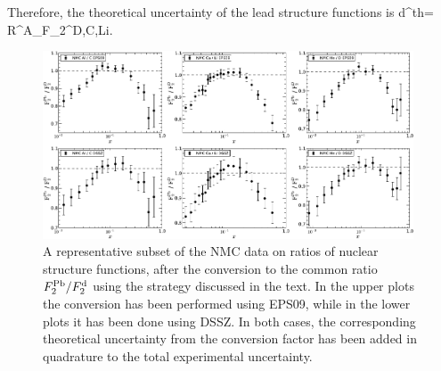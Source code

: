 Therefore, the theoretical uncertainty of the lead structure functions is
\be
d\sigma^{th}= \Delta {}R^A_{F_2^{D,C,Li}}.
\label{compression7}
\ee



\begin{figure}[t]
\begin{center}
\includegraphics[width=0.98\textwidth]{plots/fig1nmc.pdf}
\end{center}
\vspace{-0.3cm}
\caption{\small A representative subset of the NMC data
  on ratios of nuclear structure functions, after the conversion
  to the common ratio $F_2^{\rm Pb}/F_2^{\rm d}$ using the strategy
  discussed in the text.
  In the upper plots the conversion has been performed using EPS09,
  while in the lower plots it has been done using DSSZ.
  In both cases, the corresponding theoretical uncertainty from
  the conversion factor has been added in quadrature to
  the total experimental uncertainty.
}
\label{fig1nmc}
\end{figure}

